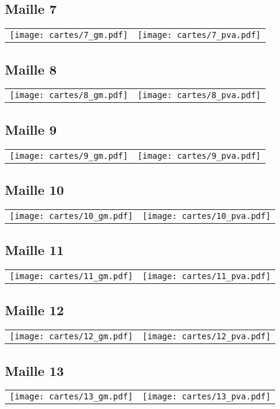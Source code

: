 \subsection{Maille 7}
\begin{tabular}{ll}
\texttt{[image: cartes/7\_gm.pdf]}
&
\texttt{[image: cartes/7\_pva.pdf]}
\end{tabular}
\newpage
\subsection{Maille 8}
\begin{tabular}{ll}
\texttt{[image: cartes/8\_gm.pdf]}
&
\texttt{[image: cartes/8\_pva.pdf]}
\end{tabular}
\newpage
\subsection{Maille 9}
\begin{tabular}{ll}
\texttt{[image: cartes/9\_gm.pdf]}
&
\texttt{[image: cartes/9\_pva.pdf]}
\end{tabular}
\newpage
\subsection{Maille 10}
\begin{tabular}{ll}
\texttt{[image: cartes/10\_gm.pdf]}
&
\texttt{[image: cartes/10\_pva.pdf]}
\end{tabular}
\newpage
\subsection{Maille 11}
\begin{tabular}{ll}
\texttt{[image: cartes/11\_gm.pdf]}
&
\texttt{[image: cartes/11\_pva.pdf]}
\end{tabular}
\newpage
\subsection{Maille 12}
\begin{tabular}{ll}
\texttt{[image: cartes/12\_gm.pdf]}
&
\texttt{[image: cartes/12\_pva.pdf]}
\end{tabular}
\newpage
\subsection{Maille 13}
\begin{tabular}{ll}
\texttt{[image: cartes/13\_gm.pdf]}
&
\texttt{[image: cartes/13\_pva.pdf]}
\end{tabular}
\newpage
